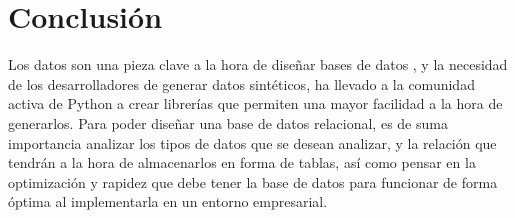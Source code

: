 \documentclass[10pt, oneside,spanish]{article}   	%
\begin{document}
\section{Conclusión}
Los datos son una pieza clave a la hora de diseñar bases de datos \cite{manuel_bases_nodate}, y la necesidad de los desarrolladores de generar datos sintéticos, ha llevado a la comunidad activa de Python a crear librerías que permiten una mayor facilidad a la hora de generarlos. Para poder diseñar una base de datos relacional, es de suma importancia analizar los tipos de datos que se desean analizar, y la relación que tendrán a la hora de almacenarlos en forma de tablas, así como pensar en la optimización y rapidez que debe tener la base de datos para funcionar de forma óptima al implementarla en un entorno empresarial. 

\nocite{*}


\end{document}

